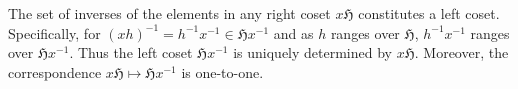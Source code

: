 The set of inverses of the elements in any right coset $x\mathfrak{H}$ constitutes a left coset. Specifically, for $(xh)^{-1} = h^{-1}x^{-1} \in \mathfrak{H}x^{-1}$ and as $h$ ranges over $\mathfrak{H}$, $h^{-1}x^{-1}$ ranges over $\mathfrak{H}x^{-1}$. Thus the left coset $\mathfrak{H}x^{-1}$ is uniquely determined by $x\mathfrak{H}$. Moreover, the correspondence $x\mathfrak{H} \mapsto \mathfrak{H}x^{-1}$ is one-to-one.
